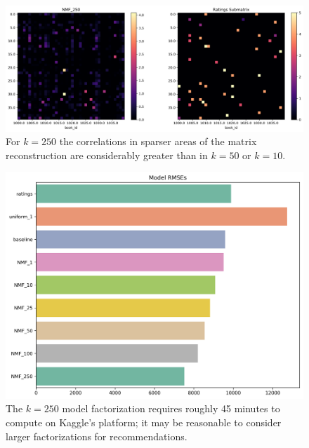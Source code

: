 \documentclass[11pt]{article}
\begin{document}
\begin{figure}[p]
    \includegraphics[width=\linewidth]{../image/goodreads-models/nmf-250-left-center-close.png}
    \caption[NMF-250-Left-center-Close]{For $k=250$ the correlations in sparser areas of the 
    matrix reconstruction are considerably greater than in $k=50$ or $k=10$.}
     \label{fig:nmf-250-left-center-close}
\end{figure}


\begin{figure}[h]
    \includegraphics[width=\linewidth]{../image/goodreads-models/model-rmses.png}
    \caption[RMSE Comparison]{The $k=250$ model factorization requires roughly 45 minutes to compute on Kaggle's platform;
    it may be reasonable to consider larger factorizations for recommendations.}
     \label{fig:rmse}
\end{figure}


\end{document}
